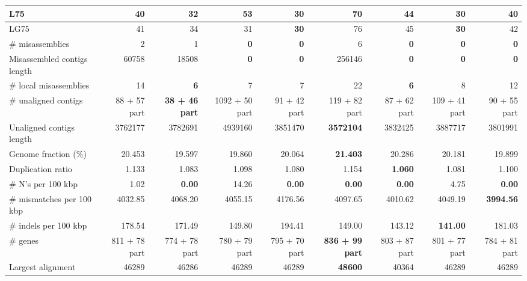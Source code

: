 \documentclass[12pt,a4paper]{article}
\begin{document}
\begin{table}[ht]
\begin{center}
\begin{tabular}{|l*{8}{|r}|}
L75 & 40 & 32 & 53 & {\bf 30} & 70 & 44 & {\bf 30} & 40 \\ \hline
LG75 & 41 & 34 & 31 & {\bf 30} & 76 & 45 & {\bf 30} & 42 \\ \hline
\# misassemblies & 2 & 1 & {\bf 0} & {\bf 0} & 6 & {\bf 0} & {\bf 0} & {\bf 0} \\ \hline
Misassembled contigs length & 60758 & 18508 & {\bf 0} & {\bf 0} & 256146 & {\bf 0} & {\bf 0} & {\bf 0} \\ \hline
\# local misassemblies & 14 & {\bf 6} & 7 & 7 & 22 & {\bf 6} & 8 & 12 \\ \hline
\# unaligned contigs & 88 + 57 part & {\bf 38 + 46 part} & 1092 + 50 part & 91 + 42 part & 119 + 82 part & 87 + 62 part & 109 + 41 part & 90 + 55 part \\ \hline
Unaligned contigs length & 3762177 & 3782691 & 4939160 & 3851470 & {\bf 3572104} & 3832425 & 3887717 & 3801991 \\ \hline
Genome fraction (\%) & 20.453 & 19.597 & 19.860 & 20.064 & {\bf 21.403} & 20.286 & 20.181 & 19.899 \\ \hline
Duplication ratio & 1.133 & 1.083 & 1.098 & 1.080 & 1.154 & {\bf 1.060} & 1.081 & 1.100 \\ \hline
\# N's per 100 kbp & 1.02 & {\bf 0.00} & 14.26 & {\bf 0.00} & {\bf 0.00} & {\bf 0.00} & 4.75 & {\bf 0.00} \\ \hline
\# mismatches per 100 kbp & 4032.85 & 4068.20 & 4055.15 & 4176.56 & 4097.65 & 4010.62 & 4049.19 & {\bf 3994.56} \\ \hline
\# indels per 100 kbp & 178.54 & 171.49 & 149.80 & 194.41 & 149.00 & 143.12 & {\bf 141.00} & 181.03 \\ \hline
\# genes & 811 + 78 part & 774 + 78 part & 780 + 79 part & 795 + 70 part & {\bf 836 + 99 part} & 803 + 87 part & 801 + 77 part & 784 + 81 part \\ \hline
Largest alignment & 46289 & 46286 & 46289 & 46289 & {\bf 48600} & 40364 & 46289 & 46289 \\ \hline
\end{tabular}
\end{center}
\end{table}
\end{document}
